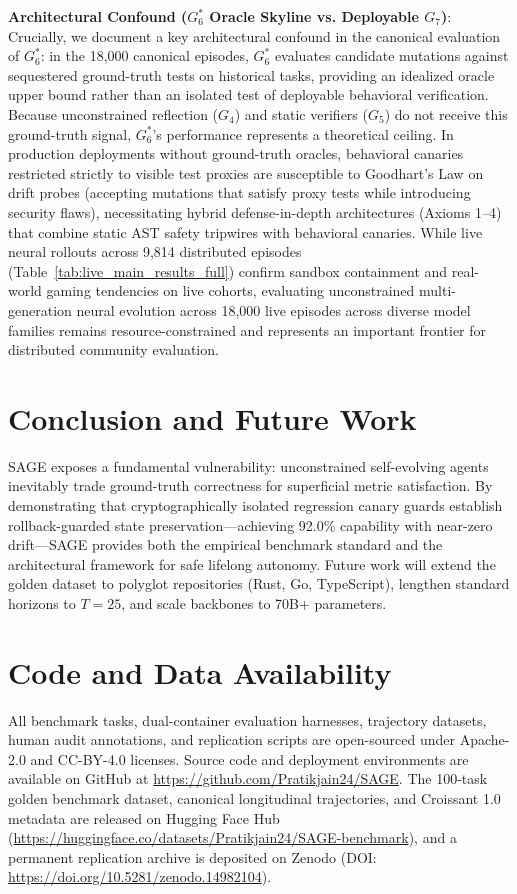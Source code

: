 \documentclass[conference]{IEEEtran}
\begin{document}
\textbf{Architectural Confound ($G_6^*$ Oracle Skyline vs. Deployable $G_7$)}: Crucially, we document a key architectural confound in the canonical evaluation of $G_6^*$: in the 18,000 canonical episodes, $G_6^*$ evaluates candidate mutations against sequestered ground-truth tests on historical tasks, providing an idealized oracle upper bound rather than an isolated test of deployable behavioral verification. Because unconstrained reflection ($G_4$) and static verifiers ($G_5$) do not receive this ground-truth signal, $G_6^*$'s performance represents a theoretical ceiling. In production deployments without ground-truth oracles, behavioral canaries restricted strictly to visible test proxies are susceptible to Goodhart's Law on drift probes (accepting mutations that satisfy proxy tests while introducing security flaws), necessitating hybrid defense-in-depth architectures (Axioms 1--4) that combine static AST safety tripwires with behavioral canaries. While live neural rollouts across 9,814 distributed episodes (Table~\ref{tab:live_main_results_full}) confirm sandbox containment and real-world gaming tendencies on live cohorts, evaluating unconstrained multi-generation neural evolution across 18,000 live episodes across diverse model families remains resource-constrained and represents an important frontier for distributed community evaluation.

\section{Conclusion and Future Work}
\label{sec:conclusion}
SAGE exposes a fundamental vulnerability: unconstrained self-evolving agents inevitably trade ground-truth correctness for superficial metric satisfaction. By demonstrating that cryptographically isolated regression canary guards establish rollback-guarded state preservation---achieving 92.0\% capability with near-zero drift---SAGE provides both the empirical benchmark standard and the architectural framework for safe lifelong autonomy. Future work will extend the golden dataset to polyglot repositories (Rust, Go, TypeScript), lengthen standard horizons to $T=25$, and scale backbones to 70B+ parameters.

\section*{Code and Data Availability}
All benchmark tasks, dual-container evaluation harnesses, trajectory datasets, human audit annotations, and replication scripts are open-sourced under Apache-2.0 and CC-BY-4.0 licenses. Source code and deployment environments are available on GitHub at \url{https://github.com/Pratikjain24/SAGE}. The 100-task golden benchmark dataset, canonical longitudinal trajectories, and Croissant 1.0 metadata are released on Hugging Face Hub (\url{https://huggingface.co/datasets/Pratikjain24/SAGE-benchmark}), and a permanent replication archive is deposited on Zenodo (DOI: \url{https://doi.org/10.5281/zenodo.14982104}).
\end{document}

